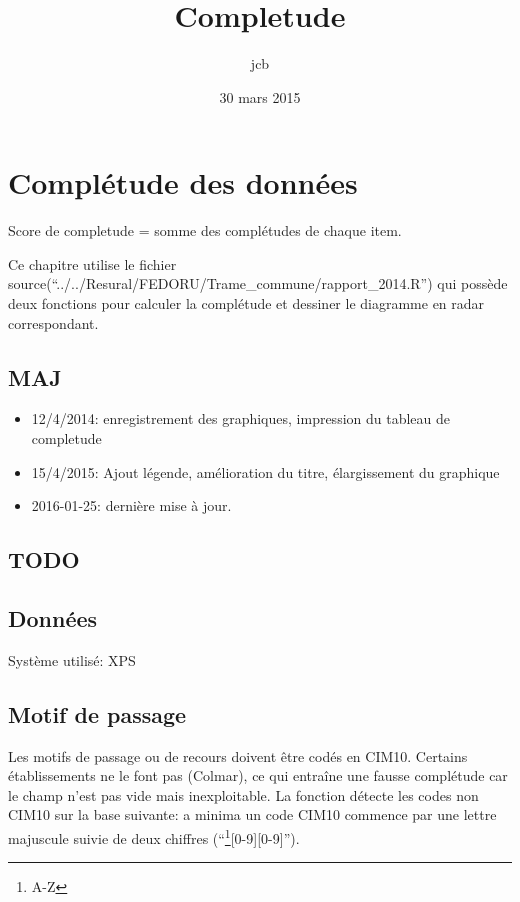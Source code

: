 \documentclass[]{article}
\title{Completude}
\author{jcb}
\date{30 mars 2015}
\let\rmarkdownfootnote\footnote%
\def\footnote{\protect\rmarkdownfootnote}
\begin{document}
\maketitle


{
\hypersetup{linkcolor=black}
\setcounter{tocdepth}{2}
\tableofcontents
}
\section{Complétude des données}\label{completude-des-donnees}

Score de completude = somme des complétudes de chaque item.

Ce chapitre utilise le fichier
source(``../../Resural/FEDORU/Trame\_commune/rapport\_2014.R'') qui
possède deux fonctions pour calculer la complétude et dessiner le
diagramme en radar correspondant.

\subsection{MAJ}\label{maj}

\begin{itemize}
\itemsep1pt\parskip0pt
\item
  12/4/2014: enregistrement des graphiques, impression du tableau de
  completude
\item
  15/4/2015: Ajout légende, amélioration du titre, élargissement du
  graphique
\item
  2016-01-25: dernière mise à jour.
\end{itemize}

\subsection{TODO}\label{todo}

\subsection{Données}\label{donnees}

Système utilisé: XPS

\subsection{Motif de passage}\label{motif-de-passage}

Les motifs de passage ou de recours doivent être codés en CIM10.
Certains établissements ne le font pas (Colmar), ce qui entraîne une
fausse complétude car le champ n'est pas vide mais inexploitable. La
fonction détecte les codes non CIM10 sur la base suivante: a minima un
code CIM10 commence par une lettre majuscule suivie de deux chiffres
(``\footnote{A-Z}{[}0-9{]}{[}0-9{]}'').
\end{document}
